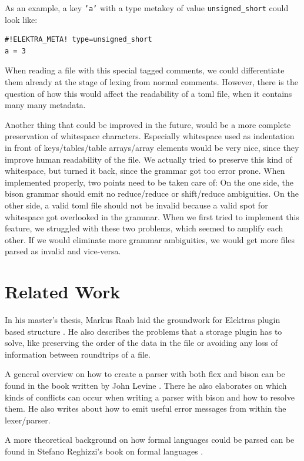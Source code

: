 \documentclass[draft,final]{vutinfth} %
\begin{document}
As an example, a key \texttt{'a'} with a type metakey of value \texttt{unsigned\_short} could look like:
\begin{Verbatim}[frame=single, fontsize=\small]
#!ELEKTRA_META! type=unsigned_short
a = 3
\end{Verbatim}
When reading a file with this special tagged comments, we could differentiate them already at the stage of lexing from normal comments.
However, there is the question of how this would affect the readability of a \acrshort{toml} file, when it contains many many metadata.

Another thing that could be improved in the future, would be a more complete preservation of whitespace characters.
Especially whitespace used as indentation in front of keys/tables/table arrays/array elements would be very nice, since they improve human readability of the file.
We actually tried to preserve this kind of whitespace, but turned it back, since the grammar got too error prone.
When implemented properly, two points need to be taken care of:
On the one side, the bison grammar should emit no reduce/reduce or shift/reduce ambiguities.
On the other side, a valid \acrshort{toml} file should not be invalid because a valid spot for whitespace got overlooked in the grammar.
When we first tried to implement this feature, we struggled with these two problems, which seemed to amplify each other.
If we would eliminate more grammar ambiguities, we would get more files parsed as invalid and vice-versa.

\chapter{Related Work}

In his master's thesis, Markus Raab laid the groundwork for Elektras plugin based structure \cite{raabmaster}.
He also describes the problems that a storage plugin has to solve, like preserving the order of the data in the file or avoiding any loss of information between roundtrips of a file.

A general overview on how to create a parser with both flex and bison can be found in the book written by John Levine \cite{levineflexbison}.
There he also elaborates on which kinds of conflicts can occur when writing a parser with bison and how to resolve them.
He also writes about how to emit useful error messages from within the lexer/parser.

A more theoretical background on how formal languages could be parsed can be found in Stefano Reghizzi's book on formal languages \cite{reghizziformallanguages}.
\end{document}
